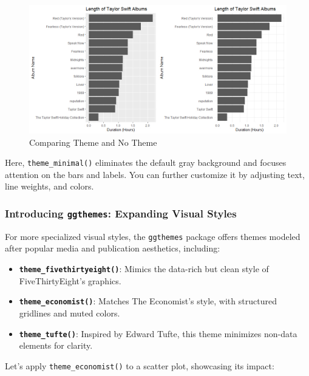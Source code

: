 \documentclass[
]{book}
\providecommand{\tightlist}{%
  \setlength{\itemsep}{0pt}\setlength{\parskip}{0pt}}
\begin{document}
\begin{figure}
\centering
\includegraphics[width=1\textwidth,height=\textheight]{images/taylor_theme.jpg}
\caption{Comparing Theme and No Theme}
\end{figure}

Here, \texttt{theme\_minimal()} eliminates the default gray background and focuses attention on the bars and labels. You can further customize it by adjusting text, line weights, and colors.

\subsubsection*{\texorpdfstring{Introducing \texttt{ggthemes}: Expanding Visual Styles}{Introducing ggthemes: Expanding Visual Styles}}\label{introducing-ggthemes-expanding-visual-styles}

For more specialized visual styles, the \texttt{ggthemes} package offers themes modeled after popular media and publication aesthetics, including:

\begin{itemize}
\tightlist
\item
  \textbf{\texttt{theme\_fivethirtyeight()}}: Mimics the data-rich but clean style of FiveThirtyEight's graphics.
\item
  \textbf{\texttt{theme\_economist()}}: Matches The Economist's style, with structured gridlines and muted colors.
\item
  \textbf{\texttt{theme\_tufte()}}: Inspired by Edward Tufte, this theme minimizes non-data elements for clarity.
\end{itemize}

Let's apply \texttt{theme\_economist()} to a scatter plot, showcasing its impact:
\end{document}
